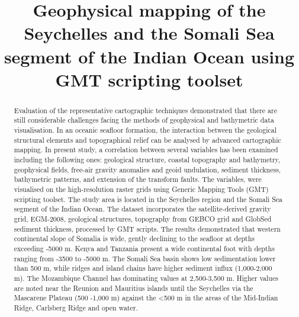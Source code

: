 \documentclass[]{interact}
\begin{document}

\title{Geophysical mapping of the Seychelles and the Somali Sea segment of the Indian Ocean using GMT scripting toolset}

\author{
}

\maketitle

\begin{abstract}
Evaluation of the representative cartographic techniques demonstrated that there are still considerable challenges facing the methods of geophysical and bathymetric data visualisation. In an oceanic seafloor formation, the interaction between the geological structural elements and topographical relief can be analysed by advanced cartographic mapping. In present study, a correlation between several variables has been examined including the following ones: geological structure, coastal topography and bathymetry, geophysical fields, free-air gravity anomalies and geoid undulation, sediment thickness, bathymetric patterns, and extension of the transform faults. The variables, were visualised on the high-resolution raster grids using Generic Mapping Tools (GMT) scripting toolset. The study area is located in the Seychelles region and the Somali Sea segment of the Indian Ocean. The dataset incorporates the satellite-derived gravity grid, EGM-2008, geological structures, topography from GEBCO grid and GlobSed sediment thickness, processed by GMT scripts. The results demonstrated that western continental slope of Somalia is wide, gently declining to the seafloor at depths exceeding -5000 m. Kenya and Tanzania present a wide continental foot with depths ranging from -3500 to -5000 m. The Somali Sea basin shows low sedimentation lower than 500 m, while ridges and island chains have higher sediment influx (1,000-2,000 m). The Mozambique Channel has dominating values at 2,500-3,500 m. Higher values are noted near the Reunion and Mauritius islands until the Seychelles via the Mascarene Plateau (500 -1,000 m) against the <500 m in the areas of the Mid-Indian Ridge, Carlsberg Ridge and open water. 
\end{abstract}
\end{document}
